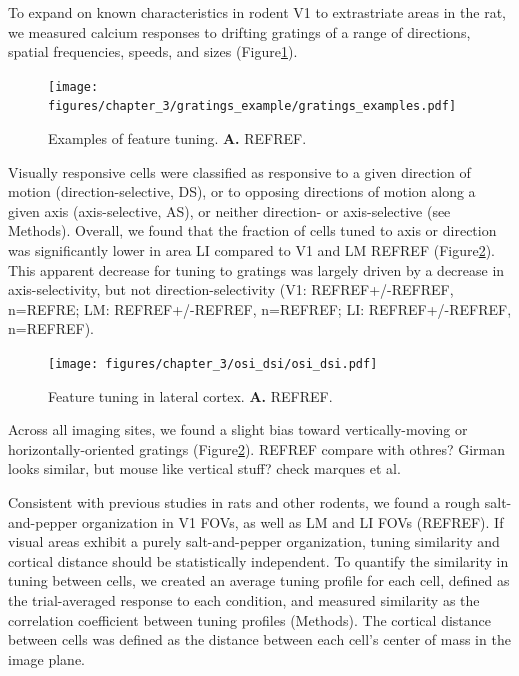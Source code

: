 To expand on known characteristics in rodent V1 to extrastriate areas in the rat, we measured calcium responses to drifting gratings of a range of directions, spatial frequencies, speeds, and sizes (Figure\ref{fig:gratings_examples}). 

\begin{figure}[t!]
    \texttt{[image: figures/chapter\_3/gratings\_example/gratings\_examples.pdf]}
    \vspace{.1in}
    \caption[Examples of feature tuning]{Examples of feature tuning. \textbf{A.} REFREF.
    \label{fig:gratings_examples}}
\end{figure}

Visually responsive cells were classified as responsive to a given direction of motion (direction-selective, DS), or to opposing directions of motion along a given axis (axis-selective, AS), or neither direction- or axis-selective (see Methods). Overall, we found that the fraction of cells tuned to axis or direction was significantly lower in area LI compared to V1 and LM REFREF (Figure\ref{fig:osi_dsi}). This apparent decrease for tuning to gratings was largely driven by a decrease in axis-selectivity, but not direction-selectivity (V1: REFREF+/-REFREF, n=REFRE; LM: REFREF+/-REFREF, n=REFREF; LI: REFREF+/-REFREF, n=REFREF). %

\begin{figure}[t!]
    \texttt{[image: figures/chapter\_3/osi\_dsi/osi\_dsi.pdf]}
    \vspace{.1in}
    \caption[Summary of feature tuning across lateral cortex]{Feature tuning in lateral cortex. \textbf{A.} REFREF.
    \label{fig:osi_dsi}}
\end{figure}

Across all imaging sites, we found a slight bias toward vertically-moving or horizontally-oriented gratings (Figure\ref{fig:osi_dsi}). REFREF compare with othres? Girman looks similar, but mouse like vertical stuff? check marques et al.


Consistent with previous studies in rats and other rodents, we found a rough salt-and-pepper organization in V1 FOVs, as well as LM and LI FOVs (REFREF). 
If visual areas exhibit a purely salt-and-pepper organization, tuning similarity and cortical distance should be statistically independent. To quantify the similarity in tuning between cells, we created an average tuning profile for each cell, defined as the trial-averaged response to each condition, and measured similarity as the correlation coefficient between tuning profiles (Methods). The cortical distance between cells was defined as the distance between each cell’s center of mass in the image plane. 

